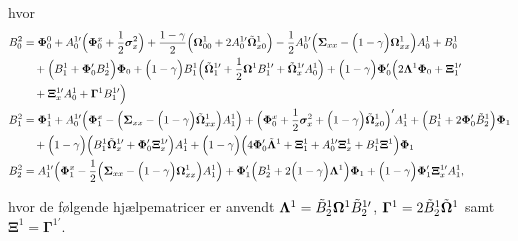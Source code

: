 \documentclass[
  a4paper,
  oneside]{memoir}
\begin{document}
hvor
\begin{align*}
B_0^2&=\bm{\Phi}_0^0 + A_0^{1\prime} \Big(\bm{\Phi}_0^x + \frac{1}{2}\bm{\sigma}_x^2\Big) + \frac{1-\gamma}{2} \Big(\bm{\Omega}_{00}^1 + 2A_0^{1\prime}\Tilde{\bm{\Omega}}_{x0}^1\Big)- \frac{1}{2} A_0^{1\prime} \Big(\bm{\Sigma}_{xx} - \Big(1-\gamma\Big) \bm{\Omega}_{xx}^1\Big) A_0^1 + B_0^1 \\
&\quad + \Big(B_1^1 + \bm{\Phi}_0' B_2^1\Big)\bm{\Phi}_0 + \Big(1-\gamma\Big) B_1^1 \Big(\Tilde{\bm{\Omega}}_1^{1\prime} + \frac{1}{2} \bm{\Omega}^1 B_1^{1\prime} + \Tilde{\bm{\Omega}}_x^{1\prime} A_0^1\Big)+ \Big(1-\gamma\Big) \bm{\Phi}_0' \Big(2\bm{\Lambda}^1 \bm{\Phi}_0 + \bm{\Xi}_1^{1\prime}\\
&\quad + \bm{\Xi}_x^{1\prime} A_0^1 + \bm{\Gamma}^1 B_1^{1\prime}\Big)\\
B_1^2&=\bm{\Phi}_1^1 + A_0^{1\prime} \Big(\bm{\Phi}_1^x - \Big(\bm{\Sigma}_{xx} - \Big(1-\gamma\Big) \Tilde{\bm{\Omega}}_{xx}^{1}\Big) A_1^1\Big) + \Big( \bm{\Phi}_0^x + \frac{1}{2} \bm{\sigma}_x^2 + \Big(1-\gamma\Big) \Tilde{\bm{\Omega}}_{x0}^{1}\Big)' A_1^1+ \Big(B_1^1 + 2\bm{\Phi}_0' \Tilde{B}_2^1\Big) \bm{\Phi}_1\\
&\quad + \Big(1-\gamma\Big) \Big(B_1^1 \Tilde{\bm{\Omega}}_{x}^{1\prime} + \bm{\Phi}_0' \bm{\Xi}_x^{1\prime}\Big) A_1^1 + \Big(1-\gamma\Big) \Big(4 \bm{\Phi}_0' \Tilde{\bm{\Lambda}}^1 + \bm{\Xi}_1^1 + A_0^{1\prime} \bm{\Xi}_x^1 + B_1^1 \bm{\Xi}^1\Big) \bm{\Phi}_1\\
B_2^2&= A_1^{1\prime} \Big(\bm{\Phi}_1^x - \frac{1}{2} \Big(\bm{\Sigma}_{xx} - \Big(1-\gamma\Big)\bm{\Omega}_{xx}^1\Big) A_1^1\Big) + \bm{\Phi}_1' \Big(B_2^1 + 2\Big(1-\gamma\Big) \bm{\Lambda}^1\Big) \bm{\Phi}_1 + \Big(1-\gamma\Big)\bm{\Phi}_1' \bm{\Xi}_x^{1\prime} A_1^1,
\end{align*}

hvor de følgende hjælpematricer er anvendt \(\bm{\Lambda}^1=\Tilde{B}_2^{1}\bm{\Omega}^1 \Tilde{B}_2^{1\prime}\), \(\bm{\Gamma}^1=2\Tilde{B}_2^{1}\Tilde{\bm{\Omega}}^1\) samt \(\bm{\Xi}^1=\bm{\Gamma}^{1\prime}\).
\end{document}
